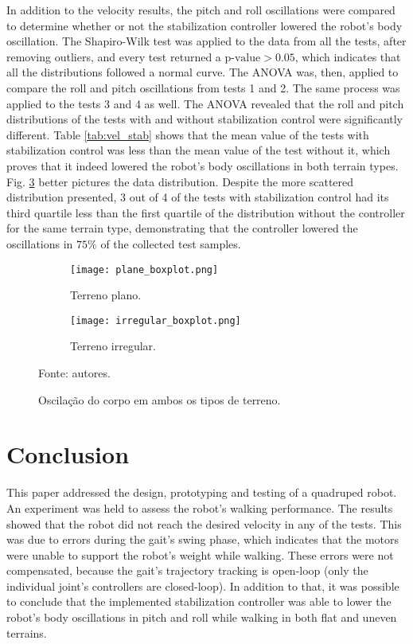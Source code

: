 \documentclass[conference]{IEEEtran}
\begin{document}
In addition to the velocity results, the pitch and roll oscillations were compared to determine whether or not the stabilization controller lowered the robot's body oscillation. The Shapiro-Wilk test was applied to the data from all the tests, after removing outliers, and every test returned a $\text{p-value} > 0.05$, which indicates that all the distributions followed a normal curve. The ANOVA was, then, applied to compare the roll and pitch oscillations from tests 1 and 2. The same process was applied to the tests 3 and 4 as well. The ANOVA revealed that the roll and pitch distributions of the tests with and without stabilization control were significantly different. Table \ref{tab:vel_stab} shows that the mean value of the tests with stabilization control was less than the mean value of the test without it, which proves that it indeed lowered the robot's body oscillations in both terrain types. Fig. \ref{fig:imu_test} better pictures the data distribution. Despite the more scattered distribution presented, 3 out of 4 of the tests with stabilization control had its third quartile less than the first quartile of the distribution without the controller for the same terrain type, demonstrating that the controller lowered the oscillations in $75\%$ of the collected test samples.

\begin{figure}[!htb]
  \centering
  \begin{subfigure}[t]{0.49\textwidth}
    \centering
    \texttt{[image: plane\_boxplot.png]}
    \caption{Terreno plano.}
    \label{fig:imu_test_plane}
  \end{subfigure}
  \begin{subfigure}[t]{0.49\textwidth}
    \centering
    \texttt{[image: irregular\_boxplot.png]}
    \caption{Terreno irregular.}
    \label{fig:imu_test_irregular}
  \end{subfigure}
  \caption{Oscilação do corpo em ambos os tipos de terreno.}
  Fonte: autores.
  \label{fig:imu_test}
\end{figure}

\section{Conclusion}

This paper addressed the design, prototyping and testing of a quadruped robot. An experiment was held to assess the robot's walking performance. The results showed that the robot did not reach the desired velocity in any of the tests. This was due to errors during the gait's swing phase, which indicates that the motors were unable to support the robot's weight while walking. These errors were not compensated, because the gait's trajectory tracking is open-loop (only the individual joint's controllers are closed-loop). In addition to that, it was possible to conclude that the implemented stabilization controller was able to lower the robot's body oscillations in pitch and roll while walking in both flat and uneven terrains.
\end{document}
